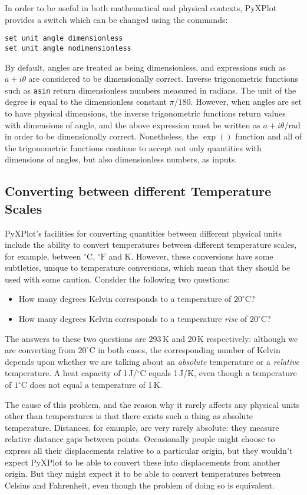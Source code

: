 In order to be useful in both mathematical and physical contexts, PyXPlot
provides a switch which can be changed using the commands:
\begin{verbatim}
set unit angle dimensionless
set unit angle nodimensionless
\end{verbatim}
By default, angles are treated as being dimensionless, and expressions such as
$a+i\theta$ are considered to be dimensionally correct. Inverse trigonometric
functions such as {\tt asin} return dimensionless numbers measured in radians.
The unit of the degree is equal to the dimensionless constant $\pi/180$.
However, when angles are set to have physical dimensions, the inverse
trigonometric functions return values with dimensions of angle, and the above
expression must be written as $a+i\theta/\mathrm{rad}$ in order to be
dimensionally correct.  Nonetheless, the $\exp()$ function and all of the
trigonometric functions continue to accept not only quantities with dimensions
of angles, but also dimensionless numbers, as inputs.

\subsection{Converting between different Temperature Scales}

PyXPlot's facilities for converting quantities between different physical units
include the ability to convert temperatures between different temperature
scales, for example, between $^\circ\mathrm{C}$, $^\circ\mathrm{F}$ and K.
However, these conversions have some subtleties, unique to temperature
conversions, which mean that they should be used with some caution. Consider
the following two questions:
\begin{itemize}
\item How many degrees Kelvin corresponds to a temperature of $20^\circ$C?
\item How many degrees Kelvin corresponds to a temperature {\it rise} of $20^\circ$C?
\end{itemize}
The answers to these two questions are 293\,K and 20\,K respectively: although
we are converting from $20^\circ$C in both cases, the corresponding number of
Kelvin depends upon whether we are talking about an {\it absolute} temperature
or a {\it relative} temperature. A heat capacity of 1\,J/$^\circ$C equals
1\,J/K, even though a temperature of $1^\circ$C does not equal a temperature of
1\,K.

The cause of this problem, and the reason why it rarely affects any physical
units other than temperatures is that there exists such a thing as absolute
temperature. Distances, for example, are very rarely absolute: they measure
relative distance gaps between points. Occasionally people might choose to
express all their displacements relative to a particular origin, but they
wouldn't expect PyXPlot to be able to convert these into displacements from
another origin. But they might expect it to be able to convert temperatures
between Celsius and Fahrenheit, even though the problem of doing so is
equivalent.


